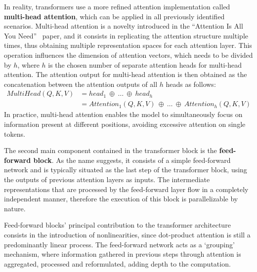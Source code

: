 In reality, transformers use a more refined attention implementation called \textbf{multi-head attention}, which can be applied in all previously identified scenarios.
Multi-head attention is a novelty introduced in the ``Attention Is All You Need''~\cite{vaswani2017} paper, and it consists in replicating the attention structure multiple times, thus obtaining multiple representation spaces for each attention layer.
This operation influences the dimension of attention vectors, which needs to be divided by $h$, where $h$ is the chosen number of separate attention heads for multi-head attention.
The attention output for multi-head attention is then obtained as the concatenation between the attention outputs of all $h$ heads as follows:
\begin{equation}
    \label{eq:background_multihead-attention}
    \begin{aligned}
    MultiHead(Q,K,V)    &= head_1\ \oplus\ \ldots\ \oplus\ head_h \\
                        &= Attention_1(Q,K,V)\ \oplus\ \ldots\ \oplus\ Attention_h(Q,K,V)
    \end{aligned}
\end{equation}
In practice, multi-head attention enables the model to simultaneously focus on information present at different positions, avoiding excessive attention on single tokens.


The second main component contained in the transformer block is the \textbf{feed-forward block}.
As the name suggests, it consists of a simple feed-forward network and is typically situated as the last step of the transformer block, using the outputs of previous attention layers as inputs.
The intermediate representations that are processed by the feed-forward layer flow in a completely independent manner, therefore the execution of this block is parallelizable by nature.

Feed-forward blocks' principal contribution to the transformer architecture consists in the introduction of nonlinearities, since dot-product attention is still a predominantly linear process.
The feed-forward network acts as a `grouping' mechanism, where information gathered in previous steps through attention is aggregated, processed and reformulated, adding depth to the computation.

